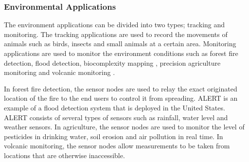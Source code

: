 
\subsubsection{Environmental Applications}
The environment applications can be divided into two types; tracking and monitoring. The tracking applications are used to record the movements of animals such as birds, insects and small animals at a certain area. Monitoring applications are used to monitor the environment conditions such as forest fire detection, flood detection, biocomplexity mapping \cite{Cerpahabitatmonitoring}, precision agriculture monitoring and volcanic monitoring \cite{volcano}.

In forest fire detection, the sensor nodes are used to relay the exact originated location of the fire to the end users to control it from spreading. ALERT is an example of a flood detection system that is deployed in the United States. ALERT consists of several types of sensors such as rainfall, water level and weather sensors. In agriculture, the sensor nodes are used to monitor the level of pesticides in drinking water, soil erosion and air pollution in real time. In volcanic monitoring, the sensor nodes allow measurements to be taken from locations that are otherwise inaccessible. 






